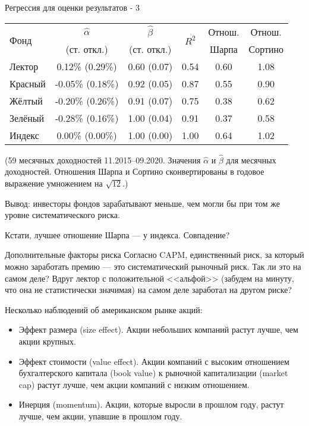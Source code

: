 \documentclass{beamer}
\begin{document}
\begin{frame}{Регрессия для оценки результатов - 3}
\center
\begin{tabular}{l|c|c|c|c|c}
\multirow{2}{*}{Фонд}    & $\hat{\alpha}$ & $\hat{\beta}$ & \multirow{2}{*}{$R^2$} & Отнош. & Отнош. \\
& \scriptsize{(ст. откл.)} & \scriptsize{(ст. откл.)} & & Шарпа & Сортино \\ \hline
Лектор  &  0.12\% \scriptsize{(0.29\%)} & 0.60 \scriptsize{(0.07)}   &  0.54 & 0.60 & 1.08 \\
Красный & -0.05\% \scriptsize{(0.18\%)} & 0.92 \scriptsize{(0.05)}   &  0.87 & 0.55 & 0.90 \\
Жёлтый  & -0.20\% \scriptsize{(0.26\%)} & 0.91 \scriptsize{(0.07)}   &  0.75 & 0.38 & 0.62 \\
Зелёный & -0.28\% \scriptsize{(0.16\%)} & 1.00 \scriptsize{(0.04)}   &  0.91 & 0.37 & 0.58 \\ \hline
Индекс  & 0.00\% \scriptsize{(0.00\%)}  & 1.00 \scriptsize{(0.00)}   &  1.00 & 0.64 & 1.02
\end{tabular}
\justify
{\scriptsize(59 месячных доходностей 11.2015--09.2020. Значения $\hat{\alpha}$ и $\hat{\beta}$ для месячных доходностей. Отношения Шарпа и Сортино сконвертированы в годовое выражение умножением на $\sqrt{12}$.)}

\vspace{\baselineskip}
Вывод: инвесторы фондов зарабатывают меньше, чем могли бы при том же уровне систематического риска.

\vspace{\baselineskip}
Кстати, лучшее отношение Шарпа --- у индекса. Совпадение?
\end{frame}



\begin{frame}{Дополнительные факторы риска}
\justify
Согласно CAPM, единственный риск, за который можно заработать премию --- это систематический рыночный риск. Так ли это на самом деле? Вдруг лектор с положительной <<альфой>> (забудем на минуту, что она не статистически значимая) на самом деле заработал на другом риске?

\vspace{\baselineskip}
Несколько наблюдений об американском рынке акций:
\begin{itemize}
\justifying
\item Эффект размера (size effect). Акции небольших компаний растут лучше, чем акции крупных.
\item Эффект стоимости (value effect). Акции компаний с высоким отношением бухгалтерского капитала (book value) к рыночной капитализации (market cap) растут лучше, чем акции компаний с низким отношением.
\item Инерция (momentum). Акции, которые выросли в прошлом году, растут лучше, чем акции, упавшие в прошлом году.
\end{itemize}
\end{frame}
\end{document}
